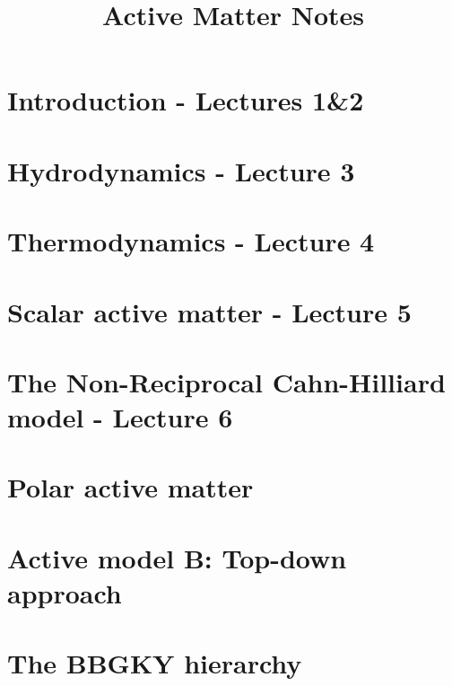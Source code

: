 \documentclass[10pt, a4paper, oneside]{book}
\title{Active Matter Notes}
\begin{document}
    \maketitle
    \clearpage


    \tableofcontents
    \clearpage

    \setlength{\parindent}{0em}
    \setlength{\parskip}{0.8em}


    \chapter{Introduction - Lectures 1\&2}
    

    \chapter{Hydrodynamics - Lecture 3}
    

    \chapter{Thermodynamics - Lecture 4}
     

    \chapter{Scalar active matter - Lecture 5}
    

    \chapter{The Non-Reciprocal Cahn-Hilliard model - Lecture 6}
    

    \chapter{Polar active matter}
    

    \appendix

    \chapter{Active model B: Top-down approach}
    

    \chapter{The BBGKY hierarchy}
    
\end{document}
